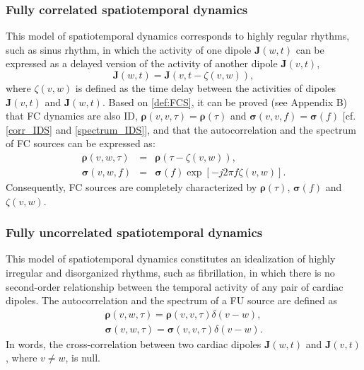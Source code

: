 \subsubsection{Fully correlated spatiotemporal dynamics}
This model of spatiotemporal dynamics corresponds to highly regular rhythms, such as sinus rhythm, in which the activity of one dipole $\mathbf{J}(w,t)$ can be expressed as a delayed version of the activity of another dipole $\mathbf{J}(v,t)$,
\begin{equation}\label{def:FCS}
\mathbf{J}(w,t)=\mathbf{J}(v,t-\zeta (v,w)),
\end{equation}
where $\zeta (v,w)$ is defined as the time delay between the activities of dipoles $\mathbf{J}(v,t)$ and $\mathbf{J}(w,t)$. Based on \eqref{def:FCS}, it can be proved (see Appendix B) that FC dynamics are also ID, $\boldsymbol{\rho}(v,v,\tau)=\boldsymbol{\rho}(\tau)$ and $\boldsymbol{\sigma}(v,v,f)=\boldsymbol{\sigma}(f)$ [cf. \eqref{corr_IDS} and \eqref{spectrum_IDS}],  and that the autocorrelation and the spectrum of FC sources can be expressed as:
\begin{eqnarray}
\boldsymbol{\rho}(v,w,\tau) &=&\boldsymbol{\rho}(\tau - \zeta (v,w)), \label{eq:autocorrelation_correlated1}\\
\boldsymbol{\sigma}(v,w,f) &=& \boldsymbol{\sigma}(f) \exp[-j2\pi f \zeta (v,w)]. \label{eq:spectrum_correlated}
\end{eqnarray}
Consequently, FC sources are completely characterized by $\boldsymbol{\rho}(\tau)$, $\boldsymbol{\sigma}(f)$ and $\zeta (v,w)$.


\subsubsection{Fully uncorrelated spatiotemporal dynamics}
This model of spatiotemporal dynamics constitutes an idealization of highly irregular and disorganized rhythms, such as fibrillation, in which there is no second-order relationship between the temporal activity of any pair of cardiac dipoles. The autocorrelation and the spectrum of a FU source are defined as
\begin{eqnarray}
\boldsymbol{\rho}(v,w,\tau)=\boldsymbol{\rho}(v,v,\tau)\delta(v-w),\label{eq:autocorrelation_uncorrelated} \\
\boldsymbol{\sigma}(v,w,\tau)=\boldsymbol{\sigma}(v,v,\tau)\delta(v-w).\label{eq:spectrum_uncorrelated}
\end{eqnarray}
In words, the cross-correlation between two cardiac dipoles $\mathbf{J}(w,t)$ and $\mathbf{J}(v,t)$, where $v\neq w$, is null.


